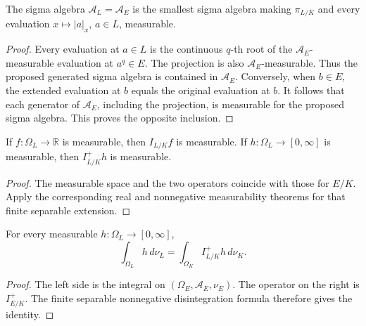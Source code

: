 \begin{lemma}
\label{lem:finite-measurable-space}
\leanok
{}
The sigma algebra $\mathcal A_L=\mathcal A_E$ is the smallest sigma
algebra making $\pi_{L/K}$ and every evaluation $x\mapsto|a|_x$,
$a\in L$, measurable.
\end{lemma}
\begin{proof}
Every evaluation at $a\in L$ is the continuous $q$-th root of the
$\mathcal A_E$-measurable evaluation at $a^q\in E$. The projection is
also $\mathcal A_E$-measurable. Thus the proposed generated sigma
algebra is contained in $\mathcal A_E$. Conversely, when $b\in E$,
the extended evaluation at $b$ equals the original evaluation at $b$.
It follows that each generator of $\mathcal A_E$, including the
projection, is measurable for the proposed sigma algebra. This proves
the opposite inclusion.
\end{proof}

\begin{lemma}
\label{lem:finite-kernel-measurable}
\leanok
{}
If $f:\Omega_L\to\mathbb R$ is measurable, then $I_{L/K}f$ is
measurable. If $h:\Omega_L\to[0,\infty]$ is measurable, then
$I^+_{L/K}h$ is measurable.
\end{lemma}
\begin{proof}
The measurable space and the two operators coincide with those for
$E/K$. Apply the corresponding real and nonnegative measurability
theorems for that finite separable extension.
\end{proof}

\begin{theorem}
\label{thm:finite-lintegral}
\leanok
{}
For every measurable $h:\Omega_L\to[0,\infty]$,
\[
 \int_{\Omega_L}h\,d\nu_L
 =\int_{\Omega_K}I^+_{L/K}h\,d\nu_K.
\]
\end{theorem}
\begin{proof}
The left side is the integral on $(\Omega_E,\mathcal A_E,\nu_E)$.
The operator on the right is $I^+_{E/K}$. The finite separable
nonnegative disintegration formula therefore gives the identity.
\end{proof}

